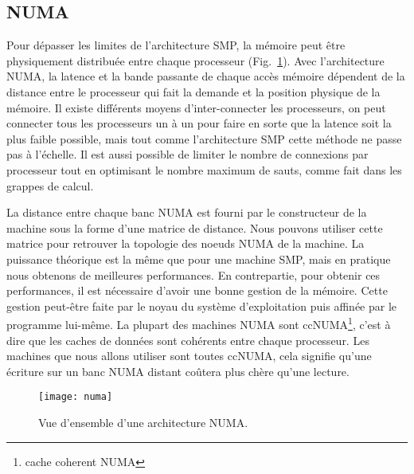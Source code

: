 \subsection{NUMA}
Pour dépasser les limites de l'architecture SMP, la mémoire peut être physiquement distribuée entre chaque processeur (Fig.~\ref{fig:numa}).
%
Avec l'architecture NUMA, la latence et la bande passante de chaque accès mémoire dépendent de la distance entre le processeur qui fait la demande et la position physique de la mémoire.
%
Il existe différents moyens d'inter-connecter les processeurs, on peut connecter tous les processeurs un à un pour faire en sorte que la latence soit la plus faible possible, mais tout comme l'architecture SMP cette méthode ne passe pas à l'échelle.
%
Il est aussi possible de limiter le nombre de connexions par processeur tout en optimisant le nombre maximum de sauts, comme fait dans les grappes de calcul.


La distance entre chaque banc NUMA est fourni par le constructeur de la machine sous la forme d'une matrice de distance.
%
Nous pouvons utiliser cette matrice pour retrouver la topologie des noeuds NUMA de la machine.
%
La puissance théorique est la même que pour une machine SMP, mais en pratique nous obtenons de meilleures performances.
%
En contrepartie, pour obtenir ces performances, il est nécessaire d'avoir une bonne gestion de la mémoire.
%
Cette gestion peut-être faite par le noyau du système d'exploitation puis affinée par le programme lui-même.
%
La plupart des machines NUMA sont ccNUMA\footnote{cache coherent NUMA}, c'est à dire que les caches de données sont cohérents entre chaque processeur.
%
Les machines que nous allons utiliser sont toutes ccNUMA, cela signifie qu'une écriture sur un banc NUMA distant coûtera plus chère qu'une lecture.


\begin{figure}[!h]
  \centering
  \texttt{[image: numa]}
  \caption{Vue d'ensemble d'une architecture NUMA.}
  \label{fig:numa}
\end{figure}

